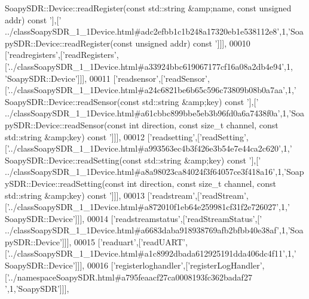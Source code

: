 \begin{DoxyCode}
{      SoapySDR::Device::readRegister(const std::string &amp;name, const unsigned addr) const '}],[\textcolor{stringliteral}{'
      ../classSoapySDR\_1\_1Device.html#adc2efbb1c1b248a17320eb1e538112e8'},1,\textcolor{stringliteral}{'SoapySDR::Device::readRegister(const unsigned addr)
       const '}]]],
00010   [\textcolor{stringliteral}{'readregisters'},[\textcolor{stringliteral}{'readRegisters'},[\textcolor{stringliteral}{'../classSoapySDR\_1\_1Device.html#a33924bbc619067177cf16a08a2db4e94'},1,\textcolor{stringliteral}{
      'SoapySDR::Device'}]]],
00011   [\textcolor{stringliteral}{'readsensor'},[\textcolor{stringliteral}{'readSensor'},[\textcolor{stringliteral}{'../classSoapySDR\_1\_1Device.html#a24c6821be6b65c596c73809b08b0a7aa'},1,\textcolor{stringliteral}{'
      SoapySDR::Device::readSensor(const std::string &amp;key) const '}],[\textcolor{stringliteral}{'
      ../classSoapySDR\_1\_1Device.html#a61cbbc899bbe5eb3b96fd0a6a7438f0a'},1,\textcolor{stringliteral}{'SoapySDR::Device::readSensor(const int direction, const size\_t channel, const
       std::string &amp;key) const '}]]],
00012   [\textcolor{stringliteral}{'readsetting'},[\textcolor{stringliteral}{'readSetting'},[\textcolor{stringliteral}{'../classSoapySDR\_1\_1Device.html#a993563ec4b3f426e3b54e7e44ca2c620'},1,\textcolor{stringliteral}{'
      SoapySDR::Device::readSetting(const std::string &amp;key) const '}],[\textcolor{stringliteral}{'
      ../classSoapySDR\_1\_1Device.html#a8a98023ca84024f3f64057ce3f418a16'},1,\textcolor{stringliteral}{'SoapySDR::Device::readSetting(const int direction, const size\_t channel, const
       std::string &amp;key) const '}]]],
00013   [\textcolor{stringliteral}{'readstream'},[\textcolor{stringliteral}{'readStream'},[\textcolor{stringliteral}{'../classSoapySDR\_1\_1Device.html#a872010f1eb64e259981cf31f2e726027'},1,\textcolor{stringliteral}{'
      SoapySDR::Device'}]]],
00014   [\textcolor{stringliteral}{'readstreamstatus'},[\textcolor{stringliteral}{'readStreamStatus'},[\textcolor{stringliteral}{'
      ../classSoapySDR\_1\_1Device.html#a6683daba918938769afb2bfbb40e38af'},1,\textcolor{stringliteral}{'SoapySDR::Device'}]]],
00015   [\textcolor{stringliteral}{'readuart'},[\textcolor{stringliteral}{'readUART'},[\textcolor{stringliteral}{'../classSoapySDR\_1\_1Device.html#a1c8992dbada612925191dda406dc4f11'},1,\textcolor{stringliteral}{'
      SoapySDR::Device'}]]],
00016   [\textcolor{stringliteral}{'registerloghandler'},[\textcolor{stringliteral}{'registerLogHandler'},[\textcolor{stringliteral}{'../namespaceSoapySDR.html#a795feaacf27ca0008193fc362badaf27
      '},1,\textcolor{stringliteral}{'SoapySDR'}]]],

\end{DoxyCode}
